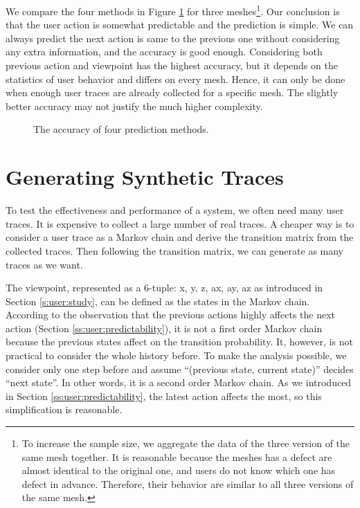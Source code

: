 We compare the four methods in Figure \ref{f:user:accuracy_comp} for three meshes\footnote{
To increase the sample size, we aggregate the data of the three version of the same mesh together.
It is reasonable because the meshes has a defect are almost identical to the original one, 
and users do not know which one has defect in advance. Therefore, their behavior are similar to
all three versions of the same mesh.}.
Our conclusion is that the user action is somewhat predictable and the prediction is simple.
We can always predict the next action is same to the previous one without considering
any extra information, and the accuracy is good enough. 
Considering both previous action and viewpoint has the highest accuracy,
but it depends on the statistics of user behavior and differs on every mesh. Hence, it can only 
be done when enough user traces are already collected for a specific mesh. 
The slightly better accuracy may not justify the much higher complexity.
\begin{figure}
    \centering
    \caption{The accuracy of four prediction methods.}
    \label{f:user:accuracy_comp}
\end{figure}

\section{Generating Synthetic Traces}
To test the effectiveness and performance of a system, we often need many user traces. 
It is expensive to collect a large number of real traces. 
A cheaper way is to consider a user trace as a Markov chain
and derive the transition matrix from the collected traces.
Then following the transition matrix, we can generate as many traces as we want.

The viewpoint, represented as a 6-tuple: {x, y, z, ax, ay, az}
as introduced in Section \ref{s:user:study}, can be defined as the states in the Markov chain.
According to the observation that the previous actions highly affects the next action
(Section \ref{ss:user:predictability}),
it is not a first order Markov chain because
the previous states affect on the transition probability. 
It, however, is not practical to consider the whole history before. 
To make the analysis possible, we consider only one step before and assume
``(previous state, current state)'' decides ``next state''. In other words, 
it is a second order Markov chain. 
As we introduced in Section \ref{ss:user:predictability}, the latest action affects the most, so
this simplification is reasonable.

